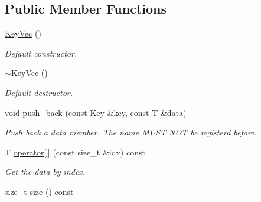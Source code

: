 \subsection*{Public Member Functions}
\begin{DoxyCompactItemize}
\item 
\mbox{\label{classilang_1_1_key_vec_aead14f2e28179c125fc71655c0590122}} 
\mbox{\hyperlink{classilang_1_1_key_vec_aead14f2e28179c125fc71655c0590122}{Key\+Vec}} ()
\begin{DoxyCompactList}\small\item\em Default constructor. \end{DoxyCompactList}\item 
\mbox{\label{classilang_1_1_key_vec_af68764e70e2d1ff4511c5b9153af68a3}} 
\mbox{\hyperlink{classilang_1_1_key_vec_af68764e70e2d1ff4511c5b9153af68a3}{$\sim$\+Key\+Vec}} ()
\begin{DoxyCompactList}\small\item\em Default destructor. \end{DoxyCompactList}\item 
\mbox{\label{classilang_1_1_key_vec_a958fe68b703ac1c7a6f4bf8502061ac5}} 
void \mbox{\hyperlink{classilang_1_1_key_vec_a958fe68b703ac1c7a6f4bf8502061ac5}{push\+\_\+back}} (const Key \&key, const T \&data)
\begin{DoxyCompactList}\small\item\em Push back a data member. The name M\+U\+ST N\+OT be registerd before. \end{DoxyCompactList}\item 
\mbox{\label{classilang_1_1_key_vec_aaf516bb40a2de02b86a0ffc05bf4e6ae}} 
T \mbox{\hyperlink{classilang_1_1_key_vec_aaf516bb40a2de02b86a0ffc05bf4e6ae}{operator\mbox{[}$\,$\mbox{]}}} (const size\+\_\+t \&idx) const
\begin{DoxyCompactList}\small\item\em Get the data by index. \end{DoxyCompactList}\item 
\mbox{\label{classilang_1_1_key_vec_a52ae0309c452aeb2c223f7a7d52d17d6}} 
size\+\_\+t \mbox{\hyperlink{classilang_1_1_key_vec_a52ae0309c452aeb2c223f7a7d52d17d6}{size}} () const

\end{DoxyCompactItemize}
